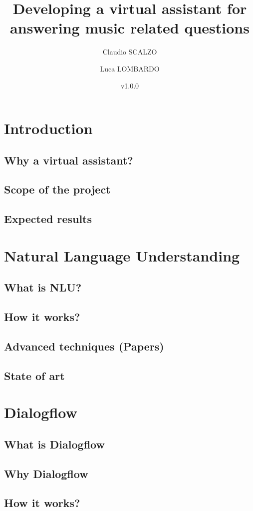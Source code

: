 \documentclass[a4paper,12pt]{report}
\title{Developing a virtual assistant for answering music related questions}
\author{Claudio SCALZO \and Luca LOMBARDO}
\date{v1.0.0}
\begin{document}
\maketitle
\tableofcontents

\chapter{Introduction}
	\section{Why a virtual assistant?}
	\section{Scope of the project}
	\section{Expected results}

\chapter{Natural Language Understanding}
	\section{What is NLU?}
	\section{How it works?}
	\section{Advanced techniques (Papers)}
	\section{State of art}

\chapter{Dialogflow}
	\section{What is Dialogflow}
	\section{Why Dialogflow}
	\section{How it works?}
\end{document}
